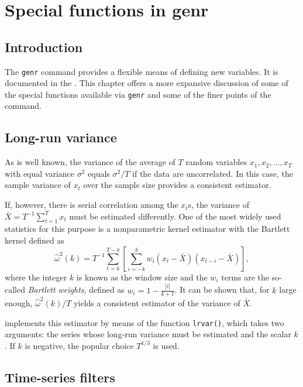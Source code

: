 \chapter{Special functions in genr}
\label{chap-genr}

\section{Introduction}
\label{genr-intro}

The \verb+genr+ command provides a flexible means of defining new
variables.  It is documented in the \GCR.  This chapter offers a more
expansive discussion of some of the special functions available via
\verb+genr+ and some of the finer points of the command.
    
\section{Long-run variance}
\label{sec:lrvar}

As is well known, the variance of the average of $T$ random variables
$x_1, x_2, \ldots, x_T$ with equal variance $\sigma^2$ equals
$\sigma^2/T$ if the data are uncorrelated. In this case, the sample
variance of $x_t$ over the sample size provides a consistent estimator.

If, however, there is serial correlation among the $x_t$s, the
variance of $\bar{X} = T^{-1} \sum_{t=1}^T x_t$ must be estimated
differently. One of the most widely used statistics for this purpose
is a nonparametric kernel estimator with the Bartlett kernel defined
as
\begin{equation}
  \label{eq:scalar-lrvar}
  \hat{\omega}^2(k) = T^{-1} \sum_{t=k}^{T-k} \left[ \sum_{i=-k}^k w_i (x_t -
  \bar{X}) (x_{t-i} - \bar{X}) \right] ,
\end{equation}
where the integer $k$ is known as the window size and the $w_i$ terms
are the so-called \emph{Bartlett weights}, defined as $w_i = 1 -
\frac{|i|}{k + 1}$. It can be shown that, for $k$ large enough,
$\hat{\omega}^2(k)/T$ yields a consistent estimator of the variance of
$\bar{X}$.

 implements this estimator by means of the function
\texttt{lrvar()}, which takes two arguments: the series whose long-run
variance must be estimated and the scalar $k$. If $k$ is negative, the
popular choice $T^{1/3}$ is used.

\section{Time-series filters}
\label{sec:filters}

